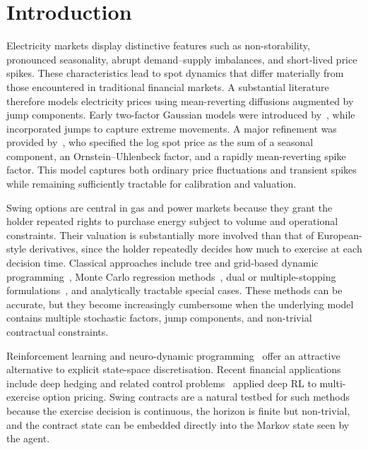 \documentclass[a4paper,fleqn]{cas-dc}
\begin{document}
\maketitle

\section{Introduction}
\label{sec:introduction}

Electricity markets display distinctive features such as non-storability, pronounced seasonality, abrupt demand--supply imbalances, and short-lived price spikes. These characteristics lead to spot dynamics that differ materially from those encountered in traditional financial markets. A substantial literature therefore models electricity prices using mean-reverting diffusions augmented by jump components. Early two-factor Gaussian models were introduced by~\cite{lucia2002electricity}, while~\cite{cartea2005pricing} incorporated jumps to capture extreme movements. A major refinement was provided by~\cite{Hambly2009}, who specified the log spot price as the sum of a seasonal component, an Ornstein--Uhlenbeck factor, and a rapidly mean-reverting spike factor. This model captures both ordinary price fluctuations and transient spikes while remaining sufficiently tractable for calibration and valuation.

Swing options are central in gas and power markets because they grant the holder repeated rights to purchase energy subject to volume and operational constraints. Their valuation is substantially more involved than that of European-style derivatives, since the holder repeatedly decides how much to exercise at each decision time. Classical approaches include tree and grid-based dynamic programming~\cite{jaillet2004valuation}, Monte Carlo regression methods~\cite{longstaff2001valuing,meinshausen2004monte}, dual or multiple-stopping formulations~\cite{carmona2008swing}, and analytically tractable special cases. These methods can be accurate, but they become increasingly cumbersome when the underlying model contains multiple stochastic factors, jump components, and non-trivial contractual constraints.

Reinforcement learning and neuro-dynamic programming~\cite{bertsekas1996neuro,sutton1998reinforcement} offer an attractive alternative to explicit state-space discretisation. Recent financial applications include deep hedging and related control problems~\cite{halperin2017qlbs,buehler2019deephedging,becker2019deepoptimalstopping,tsoskounoglou2025higherorder} applied deep RL to multi-exercise option pricing. Swing contracts are a natural testbed for such methods because the exercise decision is continuous, the horizon is finite but non-trivial, and the contract state can be embedded directly into the Markov state seen by the agent.
\end{document}
